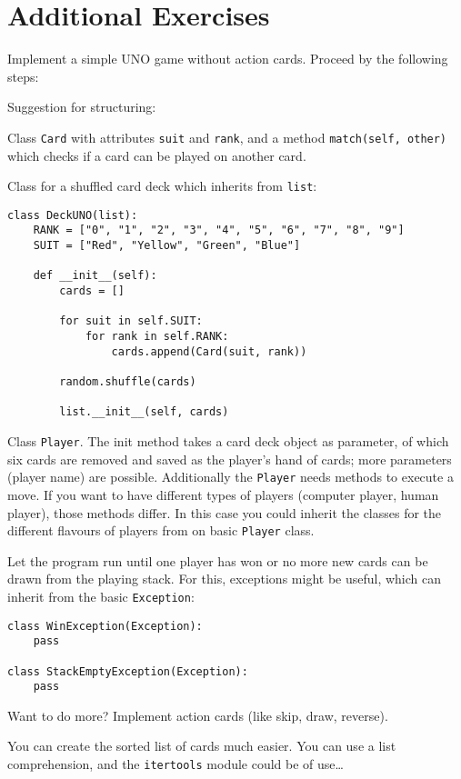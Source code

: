 \section*{Additional Exercises}

\begin{aufgabe}[UNO]
Implement a simple UNO game without action cards. Proceed by the following steps:

\begin{teilaufgabe}[Basics]
Suggestion for structuring:
\begin{auflistung}
\item Class \lstinline{Card} with attributes \lstinline{suit} and \lstinline{rank}, and a method \lstinline{match(self, other)} which checks if a card can be played on another card.
\item Class for a shuffled card deck which inherits from \lstinline{list}:
\begin{lstlisting}
class DeckUNO(list):
    RANK = ["0", "1", "2", "3", "4", "5", "6", "7", "8", "9"]
    SUIT = ["Red", "Yellow", "Green", "Blue"]

    def __init__(self):
        cards = []

        for suit in self.SUIT:
            for rank in self.RANK:
                cards.append(Card(suit, rank))

        random.shuffle(cards)

        list.__init__(self, cards)
\end{lstlisting}
\item Class \lstinline{Player}. The init method takes a card deck object as parameter, of which six cards are removed and saved as the player's hand of cards; more parameters (player name) are possible. Additionally the \lstinline{Player} needs methods to execute a move. If you want to have different types of players (computer player, human player), those methods differ. In this case you could inherit the classes for the different flavours of players from on basic \lstinline{Player} class.
\end{auflistung}
Let the program run until one player has won or no more new cards can be drawn from the playing stack. For this, exceptions might be useful, which can inherit from the basic \lstinline{Exception}:
\begin{lstlisting}
class WinException(Exception):
    pass

class StackEmptyException(Exception):
    pass
\end{lstlisting}
\end{teilaufgabe}
\begin{teilaufgabe}

Want to do more? Implement action cards (like skip, draw, reverse).
\end{teilaufgabe}
\begin{teilaufgabe}
You can create the sorted list of cards much easier. You can use a list comprehension, and the \lstinline{itertools} module could be of use\dots
\end{teilaufgabe}
\end{aufgabe}

